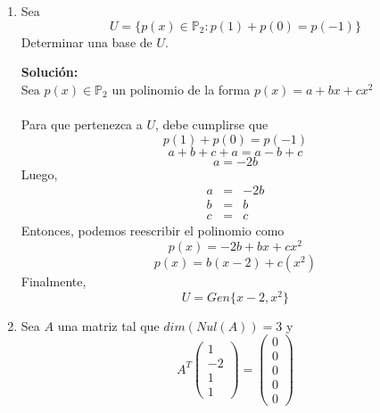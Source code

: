 \documentclass[12pt]{article}
\newenvironment{solucion}
{\begin{mdframed}[backgroundcolor=black!10]
		{\bf Solución:}\\
	}
	{
	\end{mdframed}
}
\newenvironment{preguntas}
{\begin{enumerate}\itemsep12pt
	}
	{
	\end{enumerate}
}
\newcommand{\ra}{\rightarrow}
\newcommand{\R}{\mathbb{R}}
\begin{document}
\begin{preguntas}
\begin{solucion}
\begin{enumerate}[a)]
			Como $y \in Col(A) \cap Nul(A) \ra \exists x \in \R^n (Ax = y)$\\
			\\
			Como $A^2 = A$, entonces
			$$Ay = A(Ax) = A^2x = Ax = y$$
			de donde concluimos que $y = Ay$\\
			\\
			Además, sabemos que $y \in Nul(A)$, por lo que
			$$y = Ay = 0 \ra y = 0$$
			Luego,
			$$Col(A) \cap Nul(A) = \{0\}$$
			Por lo que la afirmación es {\bf VERDADERA}.
\item Si $n$ es impar y $A$ es una matriz de $n\times n$ que satisface $A^T = -A$ entonces $Nul(A) \neq \{0\}$.\\
			\\
			$$det(-A) = (-1)^n det(A)$$
			Pero $n$ es impar, por lo que
			$$det(-A) = -det(A)$$
			Además, $det(A) = det(A^T)$. Luego,
			$$det(A) = det(A^T) = det(-A) = -det(A)$$
			$$det(A) = -det(A)$$
			$$det(A) = 0$$
			Luego, $A$ no es invertible, por lo que
			$$Nul(A) \neq \{0\}$$
			Dicho esto, la afirmación es {\bf VERDADERA}.
\end{enumerate}
\end{solucion}
\item Sea 
	$$U=\{p(x) \in \mathbb{P}_2 : p(1) + p(0) = p(-1)\}$$
	Determinar una base de $U$.
\begin{solucion}
			Sea $p(x) \in \mathbb{P}_2$ un polinomio de la forma $p(x) = a + bx + cx^2$\\
			\\
			Para que pertenezca a $U$, debe cumplirse que
			$$p(1) + p(0) = p(-1)$$
			$$a+b+c+a=a-b+c$$
			$$a = -2b$$
			Luego,
			$$\begin{array}{rcl}
			a & = & -2b\\
			b & = & b\\
			c & = & c
			\end{array}$$
			Entonces, podemos reescribir el polinomio como
			$$p(x) = -2b + bx + cx^2$$
			$$p(x) = b(x-2) + c(x^2)$$
			Finalmente,
			$$U = Gen\{x-2, x^2\}$$
\end{solucion}
\item Sea $A$ una matriz tal que $dim(Nul(A)) = 3$ y
	$$A^T \begin{pmatrix}
	1 \\ -2 \\ 1 \\ 1
	\end{pmatrix} = \begin{pmatrix}
	0 \\ 0 \\ 0 \\ 0 \\ 0

\end{pmatrix}$$
\end{preguntas}
\end{document}
